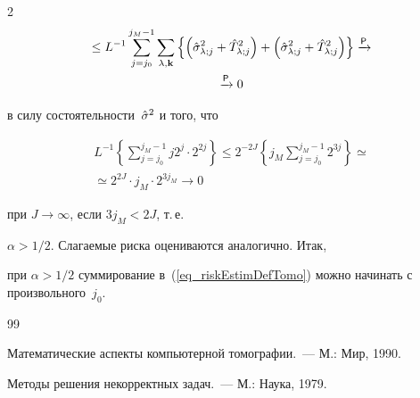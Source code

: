 \begin{multicols}{2}
\begin{multline*}
{}\leq L^{-1} \sum\limits_{j=j_0}^{j_M-1}\sum\limits_{\lambda,\mathbf{k}} \left\{ \left(\hslj+\hTlj^2\right) +


 \left(\hslj+\hTlj^2\right) \right\} \xrightarrow{\mathsf{P}}{}\\


\xrightarrow{\mathsf{P}} {} 0


\end{multline*}


в силу состоятельности~$\hat\sigma^2$ и того, что





\noindent


\begin{multline*}


L^{-1}\left\{\sum\limits_{j=j_0}^{j_M-1}j2^j\cdot2^{2j}\right\} \leq 2^{-2J}


\left\{j_M\sum\limits_{j=j_0}^{j_M-1}2^{3j}\right\} \simeq{}\\


{}\simeq 2^{2J}\cdot j_M\cdot2^{3j_M}\rightarrow 0


\end{multline*}


при $J\rightarrow\infty$, если $3j_M<2J$, т.\,е.\ 


$\alpha>1/2$. Слагаемые риска оцениваются аналогично. Итак, 


при $\alpha>1/2$ суммирование в~(\ref{eq_riskEstimDefTomo}) можно начинать с произвольного~$j_0$.








{\small\frenchspacing


{%




\begin{thebibliography}{99}









Математические аспекты компьютерной томографии.~--- М.: Мир, 1990.









Методы решения некорректных задач.~--- М.: Наука, 1979.






\end{thebibliography}}}
\end{multicols}
